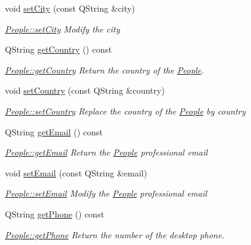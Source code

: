 \begin{DoxyCompactItemize}
void \hyperlink{classModels_1_1People_ab19eae39212a096542ed8c24567f3ca9}{set\-City} (const Q\-String \&city)
\begin{DoxyCompactList}\small\item\em \hyperlink{classModels_1_1People_ab19eae39212a096542ed8c24567f3ca9}{People\-::set\-City} Modify the {\itshape city} \end{DoxyCompactList}\item 
Q\-String \hyperlink{classModels_1_1People_a0df66681e0b8fcf099ad0a05863a8e13}{get\-Country} () const 
\begin{DoxyCompactList}\small\item\em \hyperlink{classModels_1_1People_a0df66681e0b8fcf099ad0a05863a8e13}{People\-::get\-Country} Return the country of the \hyperlink{classModels_1_1People}{People}. \end{DoxyCompactList}\item 
void \hyperlink{classModels_1_1People_a3062f5f760ee85553b28b3ef1f15492a}{set\-Country} (const Q\-String \&country)
\begin{DoxyCompactList}\small\item\em \hyperlink{classModels_1_1People_a3062f5f760ee85553b28b3ef1f15492a}{People\-::set\-Country} Replace the country of the \hyperlink{classModels_1_1People}{People} by {\itshape country} \end{DoxyCompactList}\item 
Q\-String \hyperlink{classModels_1_1People_a183e3ac09f44e38b32d7ba72aef85757}{get\-Email} () const 
\begin{DoxyCompactList}\small\item\em \hyperlink{classModels_1_1People_a183e3ac09f44e38b32d7ba72aef85757}{People\-::get\-Email} Return the \hyperlink{classModels_1_1People}{People} professional {\itshape email} \end{DoxyCompactList}\item 
void \hyperlink{classModels_1_1People_a731376949fa1d08e87c7c6ab53f792ab}{set\-Email} (const Q\-String \&email)
\begin{DoxyCompactList}\small\item\em \hyperlink{classModels_1_1People_a731376949fa1d08e87c7c6ab53f792ab}{People\-::set\-Email} Modify the \hyperlink{classModels_1_1People}{People} professional {\itshape email} \end{DoxyCompactList}\item 
Q\-String \hyperlink{classModels_1_1People_a4e30c7e027f2be5c8bc7813e37e12f94}{get\-Phone} () const 
\begin{DoxyCompactList}\small\item\em \hyperlink{classModels_1_1People_a4e30c7e027f2be5c8bc7813e37e12f94}{People\-::get\-Phone} Return the number of the desktop phone. \end{DoxyCompactList}\item 

\end{DoxyCompactItemize}
